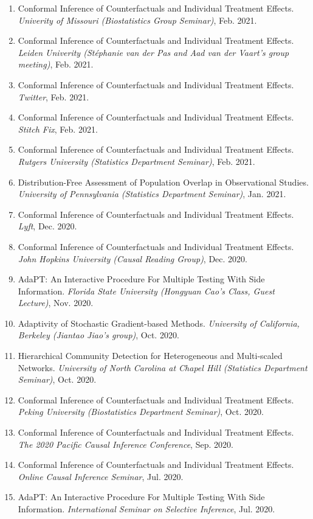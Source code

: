 \documentclass{article}
\begin{document}
\begin{enumerate}
\item Conformal Inference of Counterfactuals and Individual Treatment Effects. \emph{Univerity of Missouri (Biostatistics Group Seminar)}, Feb. 2021.
\item Conformal Inference of Counterfactuals and Individual Treatment Effects. \emph{Leiden Univerity (Stéphanie van der Pas and Aad van der Vaart's group meeting)}, Feb. 2021.
\item Conformal Inference of Counterfactuals and Individual Treatment Effects. \emph{Twitter}, Feb. 2021.
\item Conformal Inference of Counterfactuals and Individual Treatment Effects. \emph{Stitch Fix}, Feb. 2021.
\item Conformal Inference of Counterfactuals and Individual Treatment Effects. \emph{Rutgers University (Statistics Department Seminar)}, Feb. 2021.
\item Distribution-Free Assessment of Population Overlap in Observational Studies. \emph{University of Pennsylvania (Statistics Department Seminar)}, Jan. 2021.
\item Conformal Inference of Counterfactuals and Individual Treatment Effects. \emph{Lyft}, Dec. 2020.
\item Conformal Inference of Counterfactuals and Individual Treatment Effects. \emph{John Hopkins University (Causal Reading Group)}, Dec. 2020.
\item AdaPT: An Interactive Procedure For Multiple Testing With Side Information. \emph{Florida State University (Hongyuan Cao's Class, Guest Lecture)}, Nov. 2020. 
\item Adaptivity of Stochastic Gradient-based Methods. \emph{University of California, Berkeley (Jiantao Jiao's group)}, Oct. 2020. 
\item Hierarchical Community Detection for Heterogeneous and Multi-scaled Networks. \emph{University of North Carolina at Chapel Hill (Statistics Department Seminar)}, Oct. 2020. 
\item Conformal Inference of Counterfactuals and Individual Treatment Effects. \emph{Peking University (Biostatistics Department Seminar)}, Oct. 2020.
\item Conformal Inference of Counterfactuals and Individual Treatment Effects. \emph{The 2020 Pacific Causal Inference Conference}, Sep. 2020.
\item Conformal Inference of Counterfactuals and Individual Treatment Effects. \emph{Online Causal Inference Seminar}, Jul. 2020.
\item AdaPT: An Interactive Procedure For Multiple Testing With Side Information. \emph{International Seminar on Selective Inference}, Jul. 2020. 

\end{enumerate}
\end{document}
